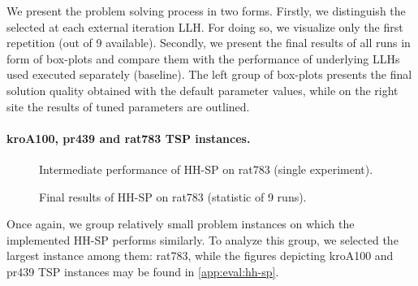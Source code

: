 We present the problem solving process in two forms. Firstly, we distinguish the selected at each external iteration LLH. For doing so, we visualize only the first repetition (out of 9 available). Secondly, we present the final results of all runs in form of box-plots and compare them with the performance of underlying LLHs used executed separately (baseline). The left group of box-plots presents the final solution quality obtained with the default parameter values, while on the right site the results of tuned parameters are outlined.

\paragraph{kroA100, pr439 and rat783 TSP instances.}
\begin{figure}[t]
	\centering
	\vspace{-20pt}
	
	\caption{Intermediate performance of HH-SP on rat783 (single experiment).}
	\vspace{-5pt}
	\label{eval:pict:hh-sp:rat783 intermediate}
\end{figure}
\begin{figure}[b]
	\centering
	\vspace{-20pt}
	
	\caption{Final results of HH-SP on rat783 (statistic of 9 runs).}
	\vspace{-5pt}
	\label{eval:pict:hh-sp:rat783 final}
\end{figure}
Once again, we group relatively small problem instances on which the implemented HH-SP performs similarly. To analyze this group, we selected the largest instance among them: rat783, while the figures depicting kroA100 and pr439 TSP instances may be found in \cref{app:eval:hh-sp}.

